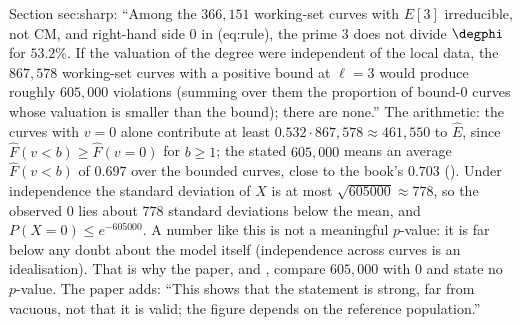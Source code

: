 \begin{sloppypar}
\begin{example}\label{ex:computation:calibration-paper}
Section sec:sharp: ``Among the $366{,}151$ working-set curves with $E[3]$ irreducible, not CM, and right-hand side $0$ in (eq:rule), the prime $3$ does not
divide $\degphi$ for $53.2\%$. If the valuation of the degree were independent of the local data, the $867{,}578$ working-set curves with a positive bound at
$\ell=3$ would produce roughly $605{,}000$ violations (summing over them the proportion of bound-$0$ curves whose valuation is smaller than the bound); there
are none.'' The arithmetic: the curves with $v=0$ alone contribute at least $0.532\cdot867{,}578\approx461{,}550$ to $\hat E$, since $\hat F(v<b)\ge\hat F(v=0)$ for $b\ge1$; the
stated $605{,}000$ means an average $\hat F(v<b)$ of $0.697$ over the bounded curves, close to the book's $0.703$ ().
Under independence the standard deviation of $X$ is at most $\sqrt{605000}\approx778$, so the observed $0$ lies about $778$ standard deviations below the
mean, and $P(X=0)\le e^{-605000}$. A number like this is not a meaningful $p$-value: it is far below any doubt about the model itself (independence
across curves is an idealisation). That is why the paper, and , compare $605{,}000$ with $0$ and state no $p$-value. The paper adds:
``This shows that the statement is strong, far from vacuous, not that it is valid; the figure depends on the reference population.''
\end{example}


\end{sloppypar}
